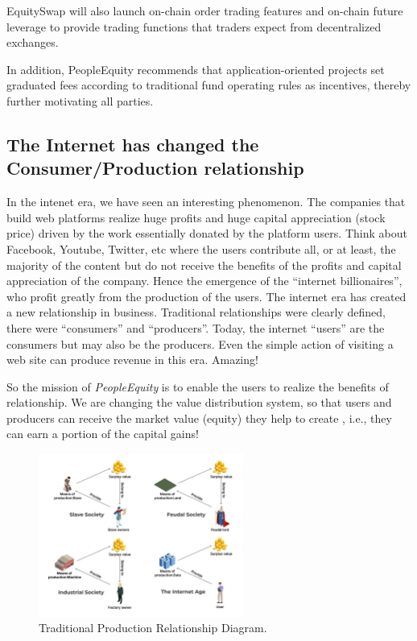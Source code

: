 \documentclass{article}
\begin{document}
EquitySwap will also launch on-chain order trading features and on-chain future leverage to provide trading functions that traders expect from decentralized exchanges.

In addition, PeopleEquity recommends that application-oriented projects set graduated fees according to traditional fund operating rules as incentives, thereby further motivating all parties.


\subsection{The Internet has changed the Consumer/Production relationship}

In the intenet era, we have seen an interesting phenomenon. The companies that build web platforms realize huge profits and huge capital appreciation (stock price) driven by the work essentially donated by the platform users. Think about Facebook, Youtube, Twitter, etc where the users contribute all, or at least, the majority of the content but do not receive the benefits of the profits and capital appreciation of the company. Hence the emergence of the “internet billionaires”, who profit greatly from the production of the users. The internet era has created a new relationship in business. Traditional relationships were clearly defined, there were “consumers” and “producers”. Today, the internet “users” are the consumers but may also be the producers. Even the simple action of visiting a web site can produce revenue in this era. Amazing!

So the mission of \emph{PeopleEquity} is to enable the users to realize the benefits of relationship. We are changing the value distribution system, so that users and producers can receive the market value (equity) they help to create , i.e., they can earn a portion of the capital gains!

\begin{figure}
\centering
\includegraphics[width=0.6\textwidth]{./img/tranditional_prp.png}
\caption{\label{fig}Traditional Production Relationship Diagram.}
\end{figure}
\end{document}
